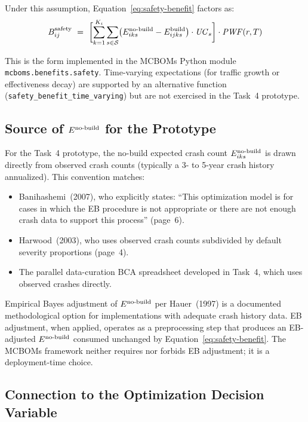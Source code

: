 Under this assumption, Equation~\ref{eq:safety-benefit} factors as:
\begin{equation}
B^{\mathrm{safety}}_{ij}\ =\ \biggl[ \sum_{k=1}^{K_i} \sum_{s \in \mathcal{S}}
  \bigl(E^{\mathrm{no\text{-}build}}_{iks} - E^{\mathrm{build}}_{ijks}\bigr) \cdot \mathit{UC}_s \biggr]
  \cdot \mathit{PWF}(r, T)
\label{eq:safety-benefit-pwf}
\end{equation}

This is the form implemented in the MCBOMs Python module
\texttt{mcboms.benefits.safety}. Time-varying expectations (for traffic growth
or effectiveness decay) are supported by an alternative function
(\texttt{safety\_benefit\_time\_varying}) but are not exercised in the Task~4
prototype.

\subsection{Source of $E^{\mathrm{no\text{-}build}}$ for the Prototype}

For the Task~4 prototype, the no-build expected crash count
$E^{\mathrm{no\text{-}build}}_{iks}$ is drawn directly from observed crash counts (typically a
3- to 5-year crash history annualized). This convention matches:
\begin{itemize}[leftmargin=2em, itemsep=2pt]
  \item Banihashemi~(2007), who explicitly states: ``This optimization model
    is for cases in which the EB procedure is not appropriate or there are
    not enough crash data to support this process'' (page~6).
  \item Harwood~(2003), who uses observed crash counts subdivided by default
    severity proportions (page~4).
  \item The parallel data-curation BCA spreadsheet developed in Task~4, which
    uses observed crashes directly.
\end{itemize}

Empirical Bayes adjustment of $E^{\mathrm{no\text{-}build}}$ per Hauer~(1997) is a documented
methodological option for implementations with adequate crash history data.
EB adjustment, when applied, operates as a preprocessing step that produces
an EB-adjusted $E^{\mathrm{no\text{-}build}}$ consumed unchanged by
Equation~\ref{eq:safety-benefit}. The MCBOMs framework neither requires nor
forbids EB adjustment; it is a deployment-time choice.

\subsection{Connection to the Optimization Decision Variable}

